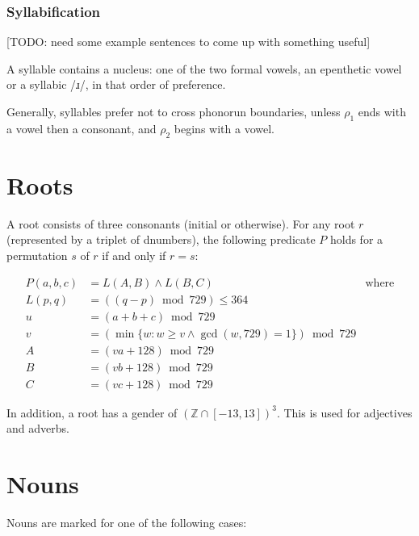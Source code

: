 \documentclass{book}
\begin{document}
\subsection{Syllabification}

{}[TODO: need some example sentences to come up with something useful]

A syllable contains a nucleus: one of the two formal vowels, an epenthetic vowel or a syllabic /ɹ/, in that order of preference.

Generally, syllables prefer not to cross phonorun boundaries, unless  $\rho_1$ ends with a vowel then a consonant, and $\rho_2$ begins with a vowel.

\chapter{Roots}

A root consists of three consonants (initial or otherwise). For any root $r$ (represented by a triplet of dnumbers), the following predicate $P$ holds for a permutation $s$ of $r$ if and only if $r = s$:

\begin{align*}
  P(a, b, c) &= L(A, B) \land L(B, C) & \text{where} \\
  L(p, q) &= ((q - p) \bmod 729) \le 364 \\
  u &= (a + b + c) \bmod 729 \\
  v &= (\min \{ w : w \ge v \land \gcd(w, 729) = 1 \}) \bmod 729 \\
  A &= (va + 128) \bmod 729 \\
  B &= (vb + 128) \bmod 729 \\
  C &= (vc + 128) \bmod 729
\end{align*}

In addition, a root has a gender of $(\mathbb{Z} \cap [-13, 13])^3$. This is used for adjectives and adverbs.

\chapter{Nouns}

Nouns are marked for one of the following cases:
\end{document}
